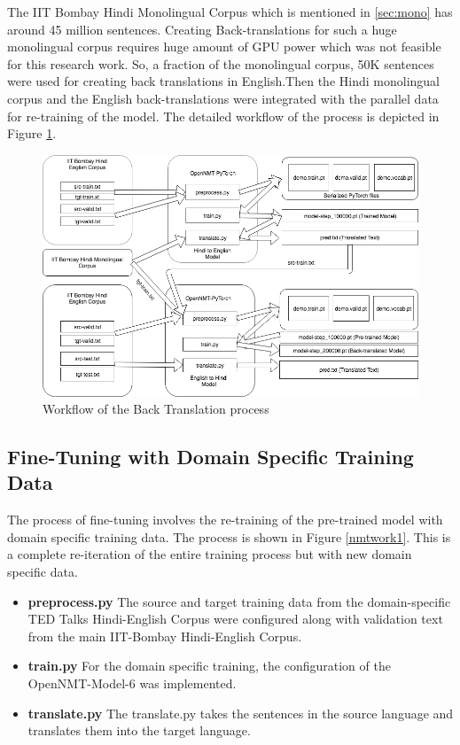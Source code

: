 The IIT Bombay Hindi Monolingual Corpus which is mentioned in \ref{sec:mono} has around 45 million sentences. Creating Back-translations for such a huge monolingual corpus requires huge amount of GPU power which was not feasible for this research work. So, a fraction of the monolingual corpus, 50K sentences were used for creating back translations in English.Then the Hindi monolingual corpus and the English back-translations were integrated with the parallel data for re-training of the model. The detailed workflow of the process is depicted in Figure \ref{backtrans}.

\begin{figure}[h]
\includegraphics[width=\textwidth]{figures/backtrans.png}
\caption{Workflow of the Back Translation process} 
\label{backtrans}
\end{figure}

\subsection{Fine-Tuning with Domain Specific Training Data}
The process of fine-tuning involves the re-training of the pre-trained model with domain specific training data. The process is shown in Figure \ref{nmtwork1}. This is a complete re-iteration of the entire training process but with new domain specific data.
\begin{itemize}
    \item \textbf{preprocess.py} The source and target training data from the domain-specific TED Talks Hindi-English Corpus were configured along with validation text from the main IIT-Bombay Hindi-English Corpus.
    \item\textbf{train.py} For the domain specific training, the configuration of the OpenNMT-Model-6 was implemented.
    \item\textbf{translate.py} The translate.py takes the sentences in the source language and translates them into the target language.
\end{itemize}

